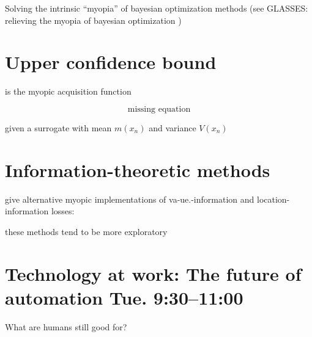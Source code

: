 Solving the intrinsic ``myopia'' of bayesian optimization methods (see GLASSES:
relieving the myopia of bayesian optimization \cite{gonzalez2016glasses})


\section{Upper confidence bound}

is the myopic acquisition function


\begin{equation}
  \text{missing equation}
\end{equation}

given a surrogate with mean $m(x_n)$ and variance $V(x_n)$


\section{Information-theoretic methods}

give alternative myopic implementations of va-ue.-information and
location-information losses:


these methods tend to be more exploratory

\section{Technology at work: The future of automation Tue. 9:30--11:00}


What are humans still good for?



